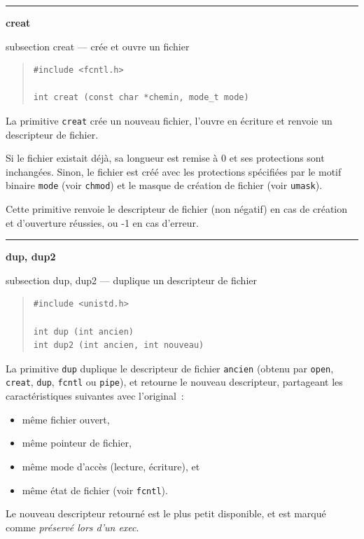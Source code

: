 \documentclass [twoside] {report}
\newcommand {\primitive} [1]
    {
	\phantomsection
	{\large \textbf {#1}}
	\addcontentsline {toc} {subsection} {#1}
    }
\newcommand {\separation}
    {
	\vspace {5mm}
	\nopagebreak
	\hrule
    }
\begin{document}
\separation
\primitive {creat} --- crée et ouvre un fichier

\begin {quote}
\begin {verbatim}
#include <fcntl.h>

int creat (const char *chemin, mode_t mode)
\end{verbatim}
\end {quote}

La primitive \texttt {creat} crée un nouveau fichier,
l'ouvre en écriture et renvoie un descripteur de
fichier.

Si le fichier existait déjà, sa longueur est
remise à 0 et ses protections sont inchangées.
Sinon, le fichier est créé avec les protections
spécifiées par le motif binaire \texttt {mode} (voir
\texttt {chmod}) et le masque de création de fichier
(voir \texttt {umask}).

Cette primitive renvoie le descripteur de fichier
(non négatif) en cas de création et d'ouverture
réussies, ou -1 en cas d'erreur.




\separation
\primitive {dup, dup2} --- duplique un descripteur de fichier

\begin {quote}
\begin {verbatim}
#include <unistd.h>

int dup (int ancien)
int dup2 (int ancien, int nouveau)
\end{verbatim}
\end {quote}

La primitive \texttt {dup} duplique le descripteur de
fichier \texttt {ancien} (obtenu par \texttt {open}, \texttt {creat},
\texttt {dup}, \texttt {fcntl} ou \texttt {pipe}), et retourne le
nouveau descripteur, partageant les
caractéristiques suivantes avec l'original~:

\begin {itemize}
    \item même fichier ouvert,
    \item même pointeur de fichier,
    \item même mode d'accès (lecture, écriture), et
    \item même état de fichier (voir \texttt {fcntl}).
\end {itemize}

Le nouveau descripteur retourné est le plus petit
disponible, et est marqué comme \textit {préservé lors
d'un exec}.
\end{document}
